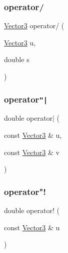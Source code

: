 \mbox{\label{class_vector3_a9059e0264f23e1c78d195b095559cb79}} 
\subsubsection{\texorpdfstring{operator/}{operator/}\hspace{0.1cm}{\footnotesize\ttfamily [1/2]}}
{\footnotesize\ttfamily \mbox{\hyperlink{class_vector3}{Vector3}} operator/ (\begin{DoxyParamCaption}\item[{\mbox{\hyperlink{class_vector3}{Vector3}}}]{u,  }\item[{double}]{s }\end{DoxyParamCaption})\hspace{0.3cm}{\ttfamily [friend]}}

\mbox{\label{class_vector3_ac0d7df6bee7a105ace4ec138bff8a262}} 
\subsubsection{\texorpdfstring{operator\texttt{"|}}{operator|}}
{\footnotesize\ttfamily double operator$\vert$ (\begin{DoxyParamCaption}\item[{const \mbox{\hyperlink{class_vector3}{Vector3}} \&}]{u,  }\item[{const \mbox{\hyperlink{class_vector3}{Vector3}} \&}]{v }\end{DoxyParamCaption})\hspace{0.3cm}{\ttfamily [friend]}}

\mbox{\label{class_vector3_ae2d5ffacf6098c4c2883e54131fa70c2}} 
\subsubsection{\texorpdfstring{operator"!}{operator!}}
{\footnotesize\ttfamily double operator! (\begin{DoxyParamCaption}\item[{const \mbox{\hyperlink{class_vector3}{Vector3}} \&}]{u }\end{DoxyParamCaption})\hspace{0.3cm}{\ttfamily [friend]}}

